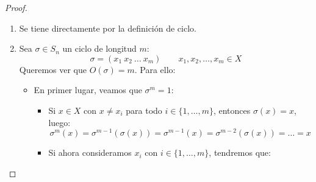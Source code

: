\begin{prop}
\begin{proof}
\begin{enumerate}
            \item Se tiene directamente por la definición de ciclo.
            \item Sea $\sigma\in S_n$ un ciclo de longitud $m$:
                \begin{equation*}
                    \sigma = (x_1\ x_2\ \ldots\ x_m) \qquad x_1,x_2,\ldots,x_m \in X
                \end{equation*}
                Queremos ver que $O(\sigma)=m$. Para ello:
                \begin{itemize}
                    \item En primer lugar, veamos que $\sigma^m = 1$:
                        \begin{itemize}
                            \item Si $x\in X$ con $x\neq x_i$ para todo $i \in \{1,\ldots,m\}$, entonces $\sigma(x)=x$, luego:
                                \begin{equation*}
                                    \sigma^m(x) = \sigma^{m-1}(\sigma(x)) = \sigma^{m-1}(x) = \sigma^{m-2}(\sigma(x)) =  \ldots = x
                                \end{equation*}
                            \item Si ahora consideramos $x_i$ con $i \in \{1,\ldots,m\}$, tendremos que:

\end{itemize}
\end{itemize}
\end{enumerate}
\end{proof}
\end{prop}
